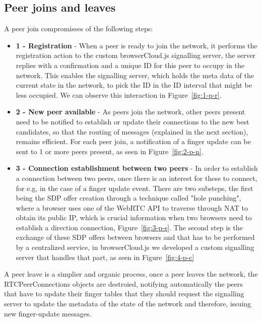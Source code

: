 \subsection{Peer joins and leaves}

A peer join compromisses of the following steps:

\begin{itemize}
    \item \textbf{1 - Registration} - When a peer is ready to join the network, it performs the registration action to the custom browserCloud.js signalling server, the server replies with a confirmation and a unique ID for this peer to occupy in the network. This enables the signalling server, which holds the meta data of the current state in the network, to pick the ID in the ID interval that might be less occupied. We can observe this interaction in Figure~\ref{fig:1-p-r}.
    \item \textbf{2 - New peer available} - As peers join the network, other peers present need to be notified to establish or update their connections to the new best candidates, so that the routing of messages (explained in the next section), remains efficient. For each peer join, a notification of a finger update can be sent to 1 or more peers present, as seen in Figure~\ref{fig:2-p-n}.
    \item \textbf{3 - Connection establishment between two peers} - In order to establish a connection between two peers, once there is an interest for these to connect, for e.g, in the case of a finger update event. There are two substeps, the first being the SDP offer creation through a technique called "hole punching", where a browser uses one of the WebRTC API to traverse through NAT to obtain its public IP, which is crucial information when two browsers need to establish a direction connection, Figure~\ref{fig:3-p-s}. The second step is the exchange of these SDP offers between browsers and that has to be performed by a centralized service, in browserCloud.js we developed a custom signalling server that handles that part, as seen in Figure~\ref{fig:4-p-c}
\end{itemize}

A peer leave is a simplier and organic process, once a peer leaves the network, the RTCPeerConnections objects are destroied, notifying automatically the peers that have to update their finger tables that they should request the signalling server to update the metadata of the state of the network and therefore, issuing new finger-update messages.

